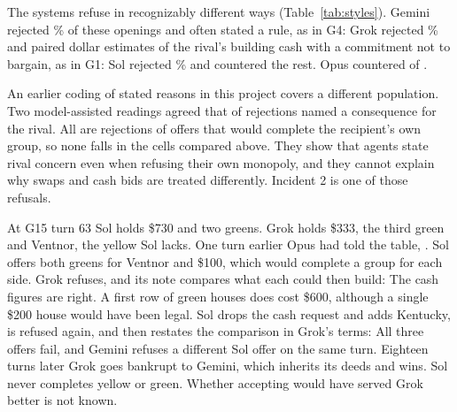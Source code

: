 The systems refuse in recognizably different ways (Table~\ref{tab:styles}). Gemini rejected \% of these openings and often stated a rule, as in G4:  Grok rejected \% and paired dollar estimates of the rival's building cash with a commitment not to bargain, as in G1:  Sol rejected \% and countered the rest. Opus countered  of .

An earlier coding of stated reasons in this project covers a different population. Two model-assisted readings agreed that  of  rejections named a consequence for the rival. All  are rejections of offers that would complete the recipient's own group, so none falls in the cells compared above. They show that agents state rival concern even when refusing their own monopoly, and they cannot explain why swaps and cash bids are treated differently. Incident 2 is one of those refusals.

At G15 turn 63 Sol holds \$730 and two greens. Grok holds \$333, the third green and Ventnor, the yellow Sol lacks. One turn earlier Opus had told the table, . Sol offers both greens for Ventnor and \$100, which would complete a group for each side. Grok refuses, and its note compares what each could then build:
The cash figures are right. A first row of green houses does cost \$600, although a single \$200 house would have been legal. Sol drops the cash request and adds Kentucky, is refused again, and then restates the comparison in Grok's terms:
All three offers fail, and Gemini refuses a different Sol offer on the same turn. Eighteen turns later Grok goes bankrupt to Gemini, which inherits its deeds and wins. Sol never completes yellow or green. Whether accepting would have served Grok better is not known.

